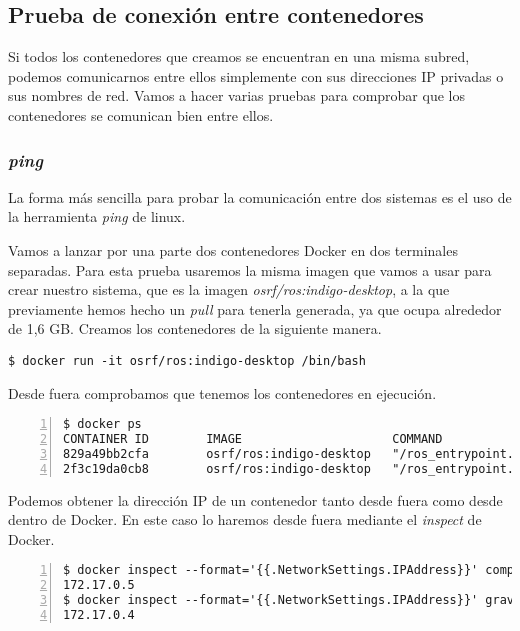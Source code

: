 		\subsection{Prueba de conexión entre contenedores}
		Si todos los contenedores que creamos se encuentran en una misma subred, podemos comunicarnos entre ellos simplemente con sus direcciones IP privadas o sus nombres de red. Vamos a hacer varias pruebas para comprobar que los contenedores se comunican bien entre ellos.
		
			\subsubsection{\textit{ping}}
			La forma más sencilla para probar la comunicación entre dos sistemas es el uso de la herramienta \emph{ping} de linux.
			
			Vamos a lanzar por una parte dos contenedores Docker en dos terminales separadas. Para esta prueba usaremos la misma imagen que vamos a usar para crear nuestro sistema, que es la imagen \emph{osrf/ros:indigo-desktop}, a la que previamente hemos hecho un \emph{pull} para tenerla generada, ya que ocupa alrededor de 1,6 GB. Creamos los contenedores de la siguiente manera.
			
			\begin{lstlisting}[style=consola]
$ docker run -it osrf/ros:indigo-desktop /bin/bash
			\end{lstlisting}
			
			Desde fuera comprobamos que tenemos los contenedores en ejecución.
			
			\begin{lstlisting}[style=consola,numbers=left]
$ docker ps
CONTAINER ID        IMAGE                     COMMAND                  CREATED             STATUS              PORTS               NAMES
829a49bb2cfa        osrf/ros:indigo-desktop   "/ros_entrypoint.sh /"   6 seconds ago       Up 6 seconds                            compassionate_mccarthy
2f3c19da0cb8        osrf/ros:indigo-desktop   "/ros_entrypoint.sh /"   16 seconds ago      Up 16 seconds                           grave_mahavira
			\end{lstlisting}
			
			Podemos obtener la dirección IP de un contenedor tanto desde fuera como desde dentro de Docker. En este caso lo haremos desde fuera mediante el \emph{inspect} de Docker.
			
			\begin{lstlisting}[style=consola,numbers=left]
$ docker inspect --format='{{.NetworkSettings.IPAddress}}' compassionate_mccarthy
172.17.0.5
$ docker inspect --format='{{.NetworkSettings.IPAddress}}' grave_mahavira
172.17.0.4
			\end{lstlisting}
			
